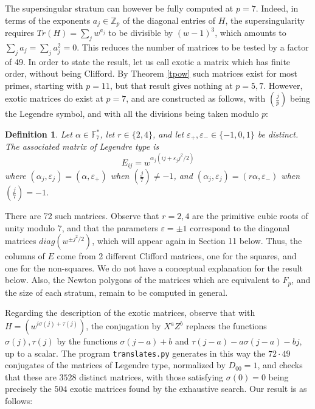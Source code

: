 \documentclass[11pt]{amsart}
\newtheorem{definition}[theorem]{Definition}
\theoremstyle{definition}
\begin{document}
\medskip

The supersingular stratum can however be fully computed at $p=7$. Indeed, in terms of the exponents $a_j\in\mathbb Z_p$ of the diagonal entries of $H$, the supersingularity requires $Tr(H)=\sum_jw^{a_j}$ to be divisible by $(w-1)^3$, which amounts to $\sum_ja_j=\sum_ja_j^2=0$. This reduces the number of matrices to be tested by a factor of 49. In order to state the result, let us call exotic a matrix which has finite order, without being Clifford. By Theorem \ref{tpow} such matrices exist for most primes, starting with $p=11$, but that result gives nothing at $p=5,7$. However, exotic matrices do exist at $p=7$, and are constructed as follows, with $\left(\frac{j}{p}\right)$ being the Legendre symbol, and with all the divisions being taken modulo $p$:

\begin{definition}\label{dleg}
Let $\alpha\in\mathbb F_7^*$, let $r\in\{2,4\}$, and let $\varepsilon_+,\varepsilon_-\in\{-1,0,1\}$ be distinct. The associated matrix of Legendre type is
$$E_{ij}=w^{\alpha_j(ij+\varepsilon_jj^2/2)}$$
where $(\alpha_j,\varepsilon_j)=(\alpha,\varepsilon_+)$ when $\left(\frac{j}{7}\right)\neq-1$, and $(\alpha_j,\varepsilon_j)=(r\alpha,\varepsilon_-)$ when $\left(\frac{j}{7}\right)=-1$.
\end{definition}

There are 72 such matrices. Observe that $r=2,4$ are the primitive cubic roots of unity modulo 7, and that the parameters $\varepsilon=\pm1$ correspond to the diagonal matrices $diag(w^{\pm j^2/2})$, which will appear again in Section 11 below. Thus, the columns of $E$ come from 2 different Clifford matrices, one for the squares, and one for the non-squares. We do not have a conceptual explanation for the result below. Also, the Newton polygons of the matrices which are equivalent to $F_p$, and the size of each stratum, remain to be computed in general.

\medskip

Regarding the description of the exotic matrices, observe that with $H=(w^{i\sigma(j)+\tau(j)})$, the conjugation by $X^aZ^b$ replaces the functions $\sigma(j),\tau(j)$ by the functions $\sigma(j-a)+b$ and $\tau(j-a)-a\sigma(j-a)-bj$, up to a scalar. The program {\tt translates.py} generates in this way the $72\cdot49$ conjugates of the matrices of Legendre type, normalized by $D_{00}=1$, and checks that these are $3528$ distinct matrices, with those satisfying $\sigma(0)=0$ being precisely the $504$ exotic matrices found by the exhaustive search. Our result is as follows:
\end{document}

